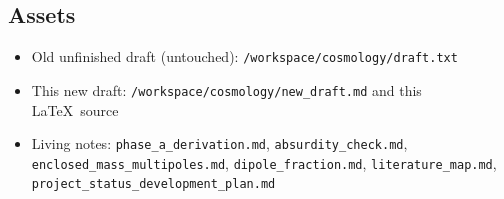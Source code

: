 \documentclass[11pt,a4paper]{article}
\begin{document}
\subsection{Assets}

\begin{itemize}
\item Old unfinished draft (untouched): \texttt{/workspace/cosmology/draft.txt}
\item This new draft: \texttt{/workspace/cosmology/new\_draft.md} and this \LaTeX\ source
\item Living notes: \texttt{phase\_a\_derivation.md}, \texttt{absurdity\_check.md}, \texttt{enclosed\_mass\_multipoles.md}, \texttt{dipole\_fraction.md}, \texttt{literature\_map.md}, \texttt{project\_status\_development\_plan.md}
\end{itemize}
\end{document}
